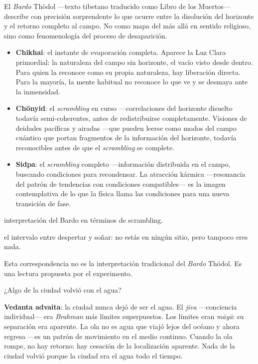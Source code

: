\noindent El \emph{Bardo} Thödol —texto tibetano traducido como Libro de los Muertos— describe con precisión sorprendente lo que ocurre entre la disolución del horizonte y el retorno completo al campo. No como mapa del más allá en sentido religioso, sino como fenomenología del proceso de desaparición.

\begin{itemize}
\item \textbf{Chikhai}: el instante de evaporación completa. Aparece la Luz Clara primordial: la naturaleza del campo sin horizonte, el vacío visto desde dentro. Para quien la reconoce como su propia naturaleza, hay liberación directa. Para la mayoría, la mente habitual no reconoce lo que ve y se desmaya ante la inmensidad.
\item \textbf{Chönyid}: el \emph{scrambling} en curso —correlaciones del horizonte disuelto todavía semi-coherentes, antes de redistribuirse completamente. Visiones de deidades pacíficas y airadas —que pueden leerse como modos del campo cuántico que portan fragmentos de la información del horizonte, todavía reconocibles antes de que el \emph{scrambling} se complete.
\item \textbf{Sidpa}: el \emph{scrambling} completo —información distribuida en el campo, buscando condiciones para recondensar. La atracción kármica —resonancia del patrón de tendencias con condiciones compatibles— es la imagen contemplativa de lo que la física llama las condiciones para una nueva transición de fase.
\end{itemize}
\begin{fisica}
 interpretación del Bardo en términos de scrambling.

 el intervalo entre despertar y soñar: no estás en ningún sitio, pero tampoco eres nada.
\end{fisica}
Esta correspondencia no es la interpretación tradicional del \emph{Bardo} Thödol. Es una lectura propuesta por el experimento.

\noindent ¿Algo de la ciudad volvió con el agua?

\textbf{Vedanta advaita}: la ciudad nunca dejó de ser el agua. El \emph{jīva} —conciencia individual— era \emph{Brahman} más límites superpuestos. Los límites eran \emph{māyā}: su separación era aparente. La ola no es agua que viajó lejos del océano y ahora regresa —es un patrón de movimiento en el medio continuo. Cuando la ola rompe, no hay retorno: hay cesación de la localización aparente. Nada de la ciudad volvió porque la ciudad era el agua todo el tiempo.

